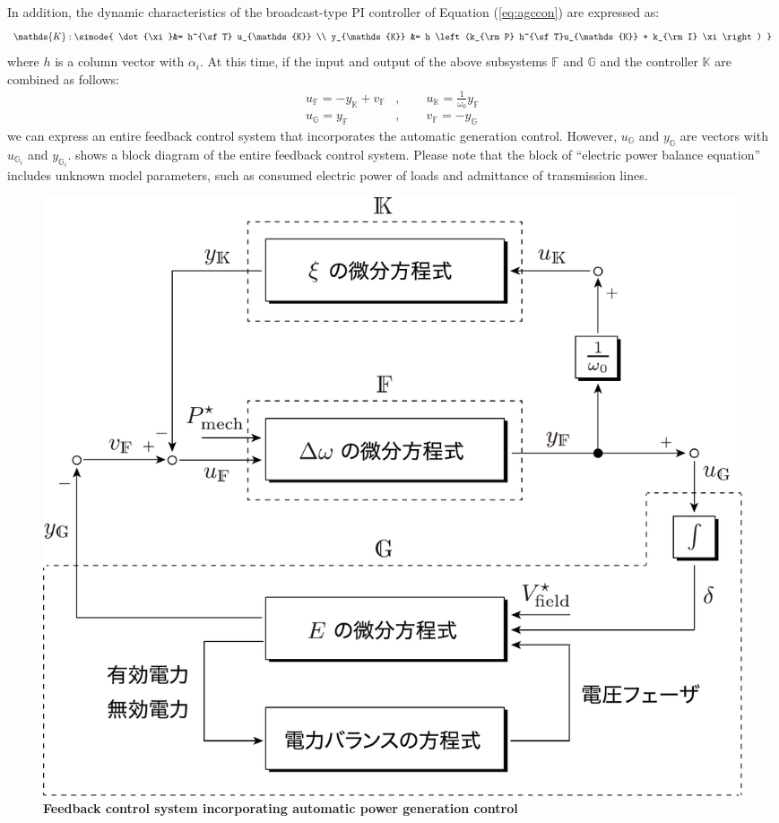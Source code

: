 \documentclass[tombow,dvipdfmx]{corona-a5-1.1}
\begin{document}
In addition, the dynamic characteristics of the broadcast-type PI controller of Equation (\ref{eq:agccon}) are expressed as:
\begin{align}\label{eq:condsK}
\mathds{K}: \simode{
\dot{\xi}&=  h^{\sf T} u_{\mathds{K}} \\
y_{\mathds{K}} &= h \left(k_{\rm P} h^{\sf T}u_{\mathds{K}} +  k_{\rm I} \xi \right)
}
\end{align}
where $h$ is a column vector with $\alpha_i$.
At this time, if the input and output of the above subsystems $\mathds{F}$ and $\mathds{G}$ and the controller $\mathds{K}$ are combined as follows:
\begin{subequations}\label{eq:connds}
\begin{align}
u_{\mathds{F}} = - y_{\mathds{K}} + v_{\mathds{F}}&
,\qquad u_{\mathds{K}} = \frac{1}{\omega_0} y_{\mathds{F}}	\label{eq:connds1}
\\
u_{\mathds{G}} = y_{\mathds{F}}&
,\qquad
v_{\mathds{F}} = - y_{\mathds{G}}		\label{eq:connds2}
\end{align}
\end{subequations}
we can express an entire feedback control system that incorporates the automatic generation control.
However, $u_{\mathds{G}}$ and $y_{\mathds{G}}$ are vectors with $u_{\mathds{G}_i}$ and $y_{\mathds{G}_i}$.
 shows a block diagram of the entire feedback control system.
Please note that the block of “electric power balance equation” includes unknown model parameters, such as consumed electric power of loads and admittance of transmission lines. 

\begin{figure}[t]
\centering
\includegraphics[width = .85\linewidth]{figs/nonlinBD}
\medskip
\caption{\textbf{Feedback control system incorporating automatic power generation control}}
\label{fig:nonlinBD}
\medskip
\end{figure}
\end{document}
